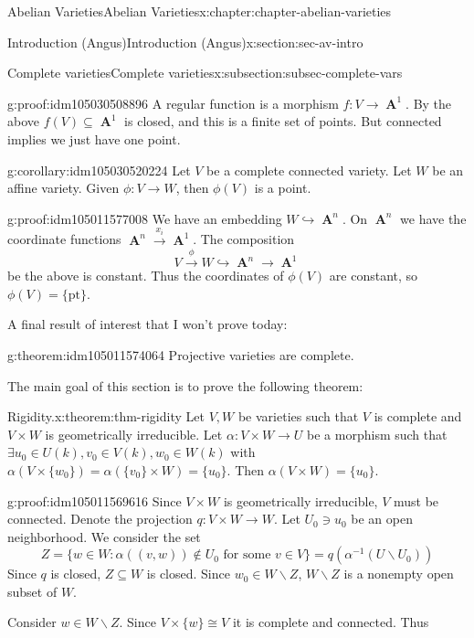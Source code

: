 \documentclass[oneside,10pt,]{book}
\numberwithin{equation}{section}
\DeclareMathOperator{\aff}{\mathbf{A}}
\begin{document}
\begin{chapterptx}{Abelian Varieties}{}{Abelian Varieties}{}{}{x:chapter:chapter-abelian-varieties}
\begin{sectionptx}{Introduction (Angus)}{}{Introduction (Angus)}{}{}{x:section:sec-av-intro}
\begin{subsectionptx}{Complete varieties}{}{Complete varieties}{}{}{x:subsection:subsec-complete-vars}
\begin{proofptx}{}{g:proof:idm105030508896}
A regular function is a morphism \(f\colon V \to \aff^1\). By the above \(f(V) \subseteq \aff^1\) is closed, and this is a finite set of points. But connected implies we just have one point.%
\end{proofptx}
\begin{corollary}{}{}{g:corollary:idm105030520224}%
Let \(V \) be a complete connected variety. Let \(W\) be an affine variety. Given \(\phi\colon V\to W\), then \(\phi (V)\) is a point.%
\end{corollary}
\begin{proofptx}{}{g:proof:idm105011577008}
We have an embedding \(W \hookrightarrow \aff^n\). On \(\aff^n\) we have the coordinate functions \(\aff^n \xrightarrow{x_i} \aff^1\). The composition%
\begin{equation*}
V \xrightarrow\phi W \hookrightarrow\aff^n \to \aff^1
\end{equation*}
be the above is constant. Thus the coordinates of \(\phi(V)\) are constant, so \(\phi(V) = \{\text{pt}\}\).%
\end{proofptx}
A final result of interest that I won't prove today:%
\begin{theorem}{}{}{g:theorem:idm105011574064}%
Projective varieties are complete.%
\end{theorem}
The main goal of this section is to prove the following theorem:%
\begin{theorem}{Rigidity.}{}{x:theorem:thm-rigidity}%
Let \(V,W\) be varieties such that \(V\) is complete and  \(V\times W\) is geometrically irreducible. Let \(\alpha\colon V\times W \to U\) be a morphism such that \(\exists u_0\in U(k), v_0\in V(k), w_0\in W(k)\) with \(\alpha(V\times\{w_0\}) = \alpha (\{v_0\}\times W ) = \{u_0\}\). Then \(\alpha (V\times W) = \{u_0\}\).%
\end{theorem}
\begin{proofptx}{}{g:proof:idm105011569616}
Since \(V\times W\) is geometrically irreducible, \(V\) must be connected. Denote the projection \(q\colon V\times W \to W\). Let \(U_0 \ni u_0\) be an open neighborhood. We consider the set%
\begin{equation*}
Z = \{w\in W : \alpha((v,w)) \not\in U_0 \text{ for some } v\in V\} = q(\alpha^{-1}(U\smallsetminus U_0))
\end{equation*}
Since \(q\) is closed, \(Z\subseteq W\) is closed. Since \(w_0\in W\smallsetminus Z\), \(W\smallsetminus Z\) is a nonempty open subset of \(W\).%
\par
Consider \(w \in W\smallsetminus Z\). Since \(V\times\{w\} \cong V\) it is complete and connected. Thus%

\end{proofptx}
\end{subsectionptx}
\end{sectionptx}
\end{chapterptx}
\end{document}
